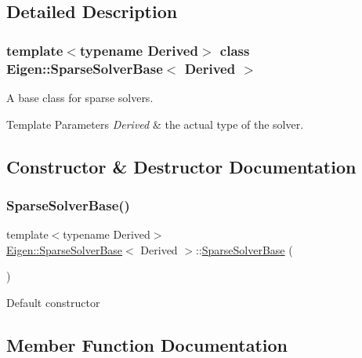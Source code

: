 \subsection{Detailed Description}
\subsubsection*{template$<$typename Derived$>$\newline
class Eigen\+::\+Sparse\+Solver\+Base$<$ Derived $>$}

A base class for sparse solvers. 


\begin{DoxyTemplParams}{Template Parameters}
{\em Derived} & the actual type of the solver. \\
\hline
\end{DoxyTemplParams}


\subsection{Constructor \& Destructor Documentation}
\mbox{\label{class_eigen_1_1_sparse_solver_base_aacd99fa17db475e74d3834767f392f33}} 
\subsubsection{\texorpdfstring{SparseSolverBase()}{SparseSolverBase()}}
{\footnotesize\ttfamily template$<$typename Derived$>$ \\
\mbox{\hyperlink{class_eigen_1_1_sparse_solver_base}{Eigen\+::\+Sparse\+Solver\+Base}}$<$ Derived $>$\+::\mbox{\hyperlink{class_eigen_1_1_sparse_solver_base}{Sparse\+Solver\+Base}} (\begin{DoxyParamCaption}{ }\end{DoxyParamCaption})\hspace{0.3cm}{\ttfamily [inline]}}

Default constructor 

\subsection{Member Function Documentation}
\mbox{\label{class_eigen_1_1_sparse_solver_base_a4a66e9498b06e3ec4ec36f06b26d4e8f}} 
